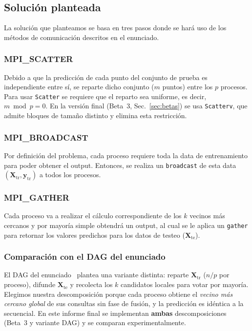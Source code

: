 \documentclass[11pt,a4paper]{article}
\newcommand{\ntr}{n}   %
\newcommand{\mte}{m}   %
\newcommand{\Xtr}{\mathbf{X}_{\text{tr}}}
\newcommand{\Xte}{\mathbf{X}_{\text{te}}}
\newcommand{\ytr}{\mathbf{y}_{\text{tr}}}
\begin{document}
\subsection{Solución planteada}
La solución que planteamos se basa en tres pasos donde se hará uso de los métodos de comunicación
descritos en el enunciado.

\subsubsection{MPI\_SCATTER}
Debido a que la predicción de cada punto del conjunto de prueba es independiente entre sí, se
reparte dicho conjunto ($\mte$ puntos) entre los $p$ procesos. Para usar \texttt{Scatter} se
requiere que el reparto sea uniforme, es decir, $\mte \bmod p = 0$. En la versión final
(Beta~3, Sec.~\ref{sec:betas}) se usa \texttt{Scatterv}, que admite bloques de tamaño distinto y
elimina esta restricción.

\subsubsection{MPI\_BROADCAST}
Por definición del problema, cada proceso requiere toda la data de entrenamiento para poder obtener
el output. Entonces, se realiza un \texttt{broadcast} de esta data $(\Xtr,\ytr)$ a todos los
procesos.

\subsubsection{MPI\_GATHER}
Cada proceso va a realizar el cálculo correspondiente de los $k$ vecinos más cercanos y por mayoría
simple obtendrá un output, al cual se le aplica un \texttt{gather} para retornar los valores
predichos para los datos de testeo ($\Xte$).

\subsubsection{Comparación con el DAG del enunciado}
El DAG del enunciado~\cite{fiestasProyecto} plantea una variante distinta: reparte $\Xtr$
($\ntr/p$ por proceso), difunde $\Xte$ y recolecta los $k$ candidatos locales para votar por
mayoría. Elegimos nuestra descomposición porque cada proceso obtiene el \emph{vecino más cercano
global} de sus consultas sin fase de fusión, y la predicción es idéntica a la secuencial. En este
informe final se implementan \textbf{ambas} descomposiciones (Beta~3 y variante DAG) y se comparan
experimentalmente.
\end{document}
